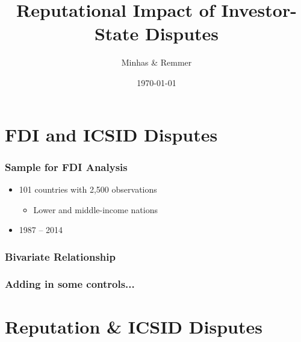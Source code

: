 \documentclass[10pt]{beamer}
\title[Contingent Institutions \hspace{14em} \insertframenumber/
\inserttotalframenumber]{Reputational Impact of Investor-State Disputes}
\author{Minhas \& Remmer}
\institute[Duke University]
{
{\emph{sfm12@duke.edu}} \\
\medskip
Duke University 
}
\date{\today}
\begin{document}
\begin{frame}
\titlepage
\end{frame}

\section{FDI and ICSID Disputes}

\begin{frame}
\frametitle{Sample for FDI Analysis}

\begin{itemize}
	\item 101 countries with 2,500 observations
	\begin{itemize}
		\item Lower and middle-income nations
	\end{itemize}
	\item 1987 -- 2014
\end{itemize}

\end{frame}

\begin{frame}
\frametitle{Bivariate Relationship}

\begin{figure}[ht]
	\centering
	\resizebox{1\textwidth}{!}{}	
\end{figure}

\end{frame}

\begin{frame}
\frametitle{Adding in some controls...}

\begin{figure}[ht]
	\centering
	\vspace{-5mm}
	\resizebox{1\textwidth}{!}{}	
\end{figure}

\end{frame}

\section{Reputation \& ICSID Disputes}
\end{document}
